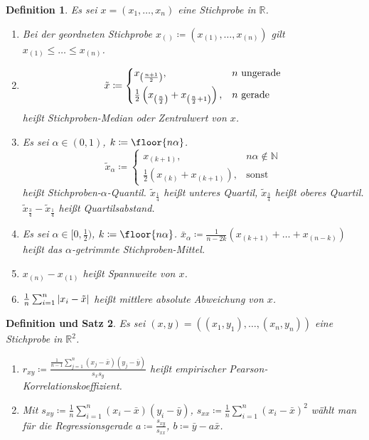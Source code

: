 \documentclass[a4paper]{article}
\newcounter{Sec}
\theoremstyle{marginbreak}
\newtheorem{definition}{Definition}[Sec]
\newtheorem{defsatz}[definition]{Definition und Satz}
\DeclarePairedDelimiter\floor\lfloor\rfloor
\newcommand{\mean}{\bar}
\newcommand{\median}{\tilde}
\newcommand{\R}{\mathbb{R}}
\newcommand{\N}{\mathbb{N}}
\begin{document}
	\begin{definition}
		Es sei $x=(x_1,\ldots,x_n)$ eine Stichprobe in $\R$.
		\begin{enumerate}[label=(\alph*)]
			\item Bei der geordneten Stichprobe $x_{()}\coloneqq (x_{(1)},\ldots,x_{(n)})$
			gilt $x_{(1)}\leq\ldots\leq x_{(n)}$.
			\item
				\begin{equation*}
					\median{x}\coloneqq\begin{cases*}
						x_{\left(\frac{n+1}{2}\right)}, &$n$ ungerade\\
						\frac{1}{2}\left(x_{\left(\frac{n}{2}\right)} + x_{\left(\frac{n}{2}+1\right)}\right), &$n$ gerade
						\end{cases*}
				\end{equation*}
				heißt Stichproben-Median oder Zentralwert von $x$.
			\item
				Es sei $\alpha\in(0, 1)$, $k\coloneqq\floor{n\alpha}$.
				\begin{equation*}
					\median{x}_\alpha\coloneqq\begin{cases}
						x_{(k+1)}, &n\alpha\notin\N\\
						\frac{1}{2}\left(x_{(k)}+x_{(k+1)}\right), &\text{sonst}
					\end{cases}
				\end{equation*}
				heißt Stichproben-$\alpha$-Quantil. $\median{x}_{\frac{1}{4}}$ heißt unteres Quartil,
				$\median{x}_{\frac{3}{4}}$ heißt oberes Quartil. $\median{x}_{\frac{3}{4}}-\median{x}_{\frac{1}{4}}$
				heißt Quartilsabstand.
			\item
				Es sei $\alpha\in [0,\frac{1}{2})$, $k\coloneqq\floor{n\alpha}$.
				$\mean{x}_\alpha\coloneqq\frac{1}{n-2k}\left(x_{(k+1)}+\dots+x_{(n-k)}\right)$ heißt
					das $\alpha$-getrimmte Stichproben-Mittel.
			\item $x_{(n)}-x_{(1)}$ heißt Spannweite von $x$.
			\item $\frac{1}{n}\sum_{i=1}^n\abs{x_i-\median{x}}$ heißt mittlere absolute Abweichung von $x$.
		\end{enumerate}
	\end{definition}
	\begin{defsatz}
		Es sei $(x, y)=((x_1, y_1),\ldots,(x_n, y_n))$ eine Stichprobe in $\R^2$.
		\begin{enumerate}[label=(\alph*)]
			\item $r_{xy}\coloneqq\frac{\frac{1}{n-1}\sum_{j=1}^n(x_j-\mean{x})(y_j-\mean{y})}{s_xs_y}$ heißt
				empirischer Pearson-Korrelationskoeffizient.
			\item Mit $s_{xy}\coloneqq\frac{1}{n}\sum_{i=1}^n(x_i-\mean{x})(y_i-\mean{y})$,
				$s_{xx}\coloneqq\frac{1}{n}\sum_{i=1}^n(x_i-\mean{x})^2$ wählt man für die Regressionsgerade
				$a\coloneqq\frac{s_{xy}}{s_{xx}}$, $b\coloneqq\mean{y}-a\mean{x}$.
		\end{enumerate}
	\end{defsatz}
\end{document}
